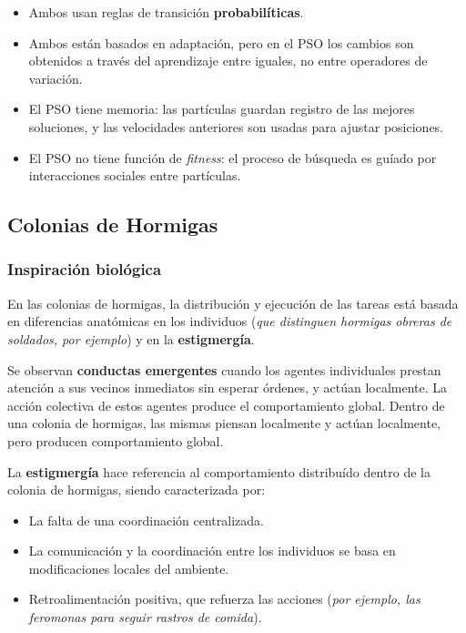 \documentclass[10pt,a4paper]{article}
\begin{document}
\begin{itemize}
\item Ambos usan reglas de transición \textbf{probabilíticas}.
\item Ambos están  basados en adaptación, pero en el PSO los cambios son obtenidos a través del aprendizaje entre iguales, no entre operadores de variación.
\item El PSO tiene memoria: las partículas guardan registro de las mejores soluciones, y las velocidades anteriores son usadas para ajustar posiciones.
\item El PSO no tiene función de \textit{fitness}: el proceso de búsqueda es guíado por interacciones sociales entre partículas.
\end{itemize}

\subsection{Colonias de Hormigas}

\subsubsection{Inspiración biológica}

En las colonias de hormigas, la distribución y ejecución de las tareas está basada en diferencias anatómicas en los individuos (\textit{que distinguen hormigas obreras de soldados, por ejemplo}) y en la \textbf{estigmergía}.

Se observan \textbf{conductas emergentes} cuando los agentes individuales prestan atención a sus vecinos inmediatos sin esperar órdenes, y actúan localmente. La acción colectiva de estos agentes produce el comportamiento global. Dentro de una colonia de hormigas, las mismas piensan localmente y  actúan localmente, pero producen comportamiento global.

La \textbf{estigmergía} hace referencia al comportamiento distribuído dentro de la colonia de hormigas, siendo caracterizada por:
\begin{itemize}
\item La falta de una coordinación centralizada.
\item La comunicación y la coordinación entre los individuos se basa en modificaciones locales del ambiente.
\item Retroalimentación positiva, que refuerza las acciones (\textit{por ejemplo, las feromonas para seguir rastros de comida}).
\end{itemize}
\end{document}
